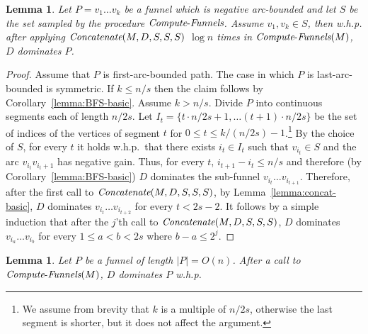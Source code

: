 \documentclass[11pt]{article}
\newtheorem{lemma}[theorem]{Lemma}
\newcommand{\Concat}{\mbox{{\it Concatenate}}}
\newcommand{\ComputeF}{\mbox{{\it Compute}-{\it Funnels}}}
\begin{document}
\begin{lemma}\label{lemma:concat-sampling-correctness}
    Let $P = v_1 \ldots v_k$ be a funnel which is negative arc-bounded and let $S$ be the set sampled by the procedure $\ComputeF$. Assume $v_1,v_k \in S$, then  w.h.p. after applying $\Concat(M,D,S,S,S)$ $\log n$ times in $\ComputeF(M)$, $D$ dominates $P$.
\end{lemma}

\begin{proof}
Assume that $P$ is first-arc-bounded path. The case in which $P$ is last-arc-bounded is symmetric.
    If $k \le n/s$ then the claim follows by Corollary~\ref{lemma:BFS-basic}. Assume $k > n/s$. Divide $P$  into continuous segments each of length $n/2s$.
    Let
    $I_t = \{t\cdot n/2s + 1, \ldots  (t+1)\cdot n/2s\}$
    be the set of indices of the vertices of segment $t$
    for 
    $0\le t \le k/(n/2s)-1$.\footnote{We assume  from brevity that $k$ is a multiple of $n/2s$, otherwise the last segment is shorter, but it does not affect the argument.} By the choice of $S$, for every $t$ it holds w.h.p.\ that there exists $i_t \in I_t$ such that $v_{i_t} \in S$ and the arc $v_{i_t}v_{i_t+1}$ has negative gain. Thus, for every $t$, $i_{t+1} -i_t \le n/s$ and therefore (by Corollary~\ref{lemma:BFS-basic}) $D$ dominates the sub-funnel $v_{i_t} \ldots v_{i_{t+1}}$. 
    Therefore, after the first call to $\Concat(M,D,S,S,S)$, by Lemma~\ref{lemma:concat-basic}, $D$ dominates $v_{i_t} \ldots v_{i_{t+2}}$ for every $t< 2s-2$.
    It follows by a simple induction that after the $j$'th call to $\Concat(M,D,S,S,S)$, $D$ dominates $v_{i_a} \ldots v_{i_{b}}$ for every $1\le a < b < 2s$ where $b-a \le 2^j$.
\end{proof}

\begin{lemma}\label{lemma:funnels-optimality}
    Let $P$ be a funnel of length $|P|=O(n)$. After a call to $\ComputeF(M)$, $D$ dominates $P$ w.h.p.
\end{lemma}
\end{document}
